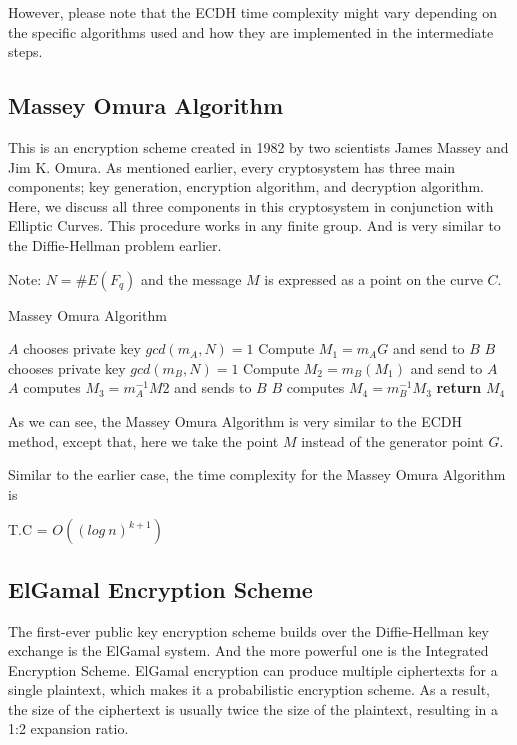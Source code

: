 \noindent However, please note that the ECDH time complexity might vary depending on the specific algorithms used and how they are implemented in the intermediate steps.

\subsection{Massey Omura Algorithm}
This is an encryption scheme created in 1982 by two scientists James Massey and Jim K. Omura. As mentioned earlier, every cryptosystem has three main components; key generation, encryption algorithm, and decryption algorithm. Here, we discuss all three components in this cryptosystem in conjunction with Elliptic Curves.
This procedure works in any finite group. And is very similar to the Diffie-Hellman problem earlier.

\noindent Note: $N = \#E(F_q)$ and the message $M$ is expressed as a point on the curve $C$.
\begin{algorithm}
\caption{Massey Omura Algorithm}\label{massey-omura}
\begin{algorithmic}[1]
\State $A$ chooses private key $gcd(m_A, N) = 1$
\State Compute $M_1 = m_AG$ and send to $B$
\State $B$ chooses private key $gcd(m_B, N) = 1$
\State Compute $M_2 = m_B(M_1)$ and send to $A$
\State $A$ computes $M_3 = m_A^{-1}M2$ and sends to $B$
\State $B$ computes $M_4 = m_B^{-1}M_3$
\State \textbf{return} $M_4$
\EndProcedure
\end{algorithmic}
\end{algorithm}

\noindent As we can see, the Massey Omura Algorithm is very similar to the ECDH method, except that, here we take the point $M$ instead of the generator point $G$. \newline

\par
\noindent Similar to the earlier case, the time complexity for the Massey Omura Algorithm is
\begin{center}
    T.C = $O((log\:n)^{k+1})$
\end{center}

\subsection{ElGamal Encryption Scheme}
The first-ever public key encryption scheme builds over the Diffie-Hellman key exchange is the ElGamal system. And the more powerful one is the Integrated Encryption Scheme.
ElGamal encryption can produce multiple ciphertexts for a single plaintext, which makes it a probabilistic encryption scheme. As a result, the size of the ciphertext is usually twice the size of the plaintext, resulting in a 1:2 expansion ratio.

